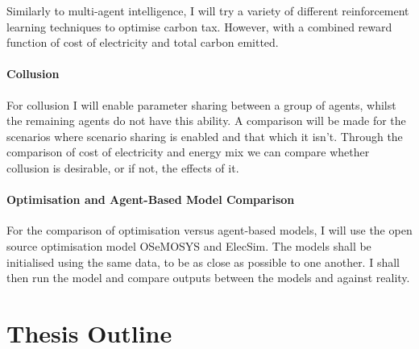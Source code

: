\documentclass[12pt]{article}
\begin{document}
Similarly to multi-agent intelligence, I will try a variety of different reinforcement learning techniques to optimise carbon tax. However, with a combined reward function of cost of electricity and total carbon emitted.

\paragraph{Collusion}

For collusion I will enable parameter sharing between a group of agents, whilst the remaining agents do not have this ability. A comparison will be made for the scenarios where scenario sharing is enabled and that which it isn't. Through the comparison of cost of electricity and energy mix we can compare whether collusion is desirable, or if not, the effects of it.

\paragraph{Optimisation and Agent-Based Model Comparison}

For the comparison of optimisation versus agent-based models, I will use the open source optimisation model OSeMOSYS and ElecSim. The models shall be initialised using the same data, to be as close as possible to one another. I shall then run the model and compare outputs between the models and against reality.













\clearpage

\section{Thesis Outline}
\end{document}
